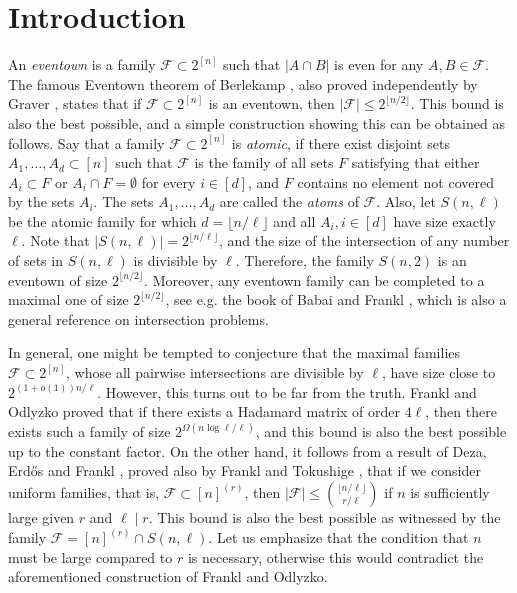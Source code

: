 \section{Introduction}
	
	An \emph{eventown} is a family $\mathcal{F}\subset 2^{[n]}$ such that $|A\cap B|$ is even for any $A,B\in\mathcal{F}$. The famous Eventown theorem of Berlekamp \cite{B69},  also proved independently by Graver \cite{G75}, states that if $\mathcal{F}\subset 2^{[n]}$ is an eventown, then $|\mathcal{F}|\leq 2^{\lfloor n/2\rfloor}$. This bound is also the best possible, and a simple construction showing this can be obtained as follows. Say that a family $\mathcal{F}\subset 2^{[n]}$ is \emph{atomic}, if there exist disjoint sets $A_1,\dots,A_d\subset [n]$ such that $\mathcal{F}$ is the family of all sets $F$ satisfying that either $A_i\subset F$ or $A_i\cap F=\emptyset$ for every $i\in [d]$, and $F$ contains no element not covered by the sets $A_i$. 
	The sets $A_1,\dots,A_d$ are called the {\em atoms} of $\mathcal{F}$. 
	Also, let $S(n,\ell)$ be the atomic family for which $d=\lfloor n/\ell\rfloor$ and all $A_i, i\in [d]$ have size exactly $\ell$. Note that $|S(n,\ell)|=2^{\lfloor n/\ell\rfloor}$, and the size of the intersection of any number of sets in $S(n,\ell)$ is divisible by $\ell$. Therefore, the family $S(n,2)$ is an eventown of size $2^{\lfloor n/2\rfloor}$. 
	Moreover, any eventown family can be completed to a maximal one of size $2^{\lfloor n/2\rfloor}$, see e.g. the book of Babai and Frankl \cite{BF92}, which is also a general reference on intersection problems.
	
	In general, one might be tempted to conjecture that the maximal families $\mathcal{F}\subset 2^{[n]}$, whose all pairwise intersections are divisible by $\ell$, have size close to $2^{(1+o(1))n/\ell}$. However, this turns out to be far from the truth. Frankl and Odlyzko \cite{FO83} proved that if there exists a Hadamard matrix of order $4\ell$, then there exists such a family of size $2^{\Omega(n\log \ell/\ell)}$, and this bound is also the best possible up to the constant factor. On the other hand, it follows from a result of Deza, Erd\H{o}s and Frankl \cite{DEF78}, proved also by Frankl and Tokushige \cite{FT16},  that if we consider uniform families, that is, $\mathcal{F}\subset [n]^{(r)}$, then $|\mathcal{F}|\leq \binom{\lfloor n/\ell\rfloor}{ r/\ell}$ if $n$ is sufficiently large given $r$ and $\ell\mid r$. This bound is also the best possible as witnessed by the family $\mathcal{F}=[n]^{(r)}\cap S(n,\ell)$. Let us emphasize that the condition that $n$ must be large compared to $r$ is necessary, otherwise this would contradict the aforementioned construction of Frankl and Odlyzko.
	
